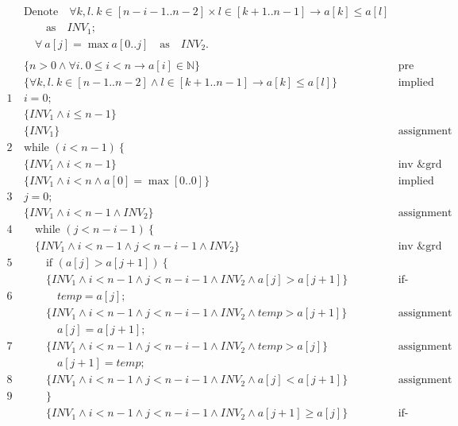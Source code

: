 \documentclass{article}
\begin{document}
\begin{align*}
&\text{Denote} \quad \forall k, l. \ k \in [n-i-1..n-2] \times l \in [k+1..n-1] \to a[k] \leq a[l] \\
&\quad\quad\text{as} \quad INV_1; \\
&\quad \forall \ a[j] = \max a[0..j] \quad \text{as} \quad INV_2. \\
\\
& \{ n > 0 \land \forall i. \ 0 \leq i < n \to a[i] \in \mathbb{N} \} & \text{pre} \\
& \{ \forall k, l. \ k \in [n-1..n-2] \land l \in [k+1..n-1] \to a[k] \leq a[l] \}  & \text{implied} \\
1 \ & i = 0; \\
& \{ INV_1 \land i \leq n-1 \} \\
& \{ INV_1 \}  & \text{assignment} \\
2 \ & \text{while } (i < n-1) \ \{ \\
& \{ INV_1 \land i < n-1 \} & \text{inv \& grd} \\
& \{ INV_1 \land i < n \land a[0] = \max[0..0] \}  & \text{implied} \\
3 \ & j = 0; \\
& \{ INV_1 \land i < n-1 \land INV_2 \}  & \text{assignment} \\
4 \ & \quad \text{while } (j < n-i-1) \ \{ \\
& \quad \{ INV_1 \land i < n-1 \land j < n-i-1 \land INV_2 \}  & \text{inv \& grd} \\
5 \ & \quad \quad \text{if } (a[j] > a[j+1]) \ \{ \\
& \quad \quad \{ INV_1 \land i < n-1 \land j < n-i-1 \land INV_2 \land a[j] > a[j+1] \}  & \text{if-statement} \\
6 \ & \quad \quad \quad temp = a[j]; \\
& \quad \quad \{ INV_1 \land i < n-1 \land j < n-i-1 \land INV_2 \land temp > a[j+1] \}  & \text{assignment} \\
& \quad \quad \quad a[j] = a[j+1]; \\
7 \ & \quad \quad \{ INV_1 \land i < n-1 \land j < n-i-1 \land INV_2 \land temp > a[j] \}  & \text{assignment} \\
& \quad \quad \quad a[j+1] = temp; \\
8 \ & \quad \quad \{ INV_1 \land i < n-1 \land j < n-i-1 \land INV_2 \land a[j] < a[j+1] \}  & \text{assignment} \\
9 \ & \quad \quad \} \\
& \quad \quad \{ INV_1 \land i < n-1 \land j < n-i-1 \land INV_2 \land a[j+1] \geq a[j] \}  & \text{if-statement} \\

\end{align*}
\end{document}
